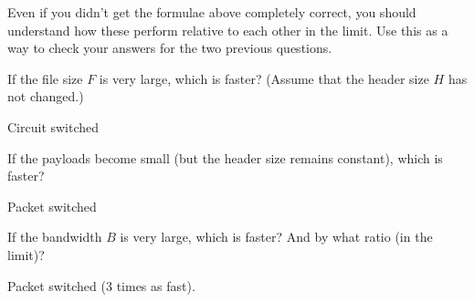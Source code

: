 \documentclass{supervision}
\begin{document}
\begin{questions}
\begin{parts}
\begin{description}
      Even if you didn’t get the formulae above completely correct, you should understand how these perform relative to each other in the limit. Use this as a way to check your answers for the two previous questions.
      \begin{subparts}
        \subpart
        If the file size $F$ is very large, which is faster? (Assume that
the header size $H$ has not changed.)
        \begin{solution}
        Circuit switched
        \end{solution}

        \subpart
        If the payloads become small (but the header size remains constant), which is faster?
        \begin{solution}
        Packet switched
        \end{solution}

        \subpart
        If the bandwidth $B$ is very large, which is faster? And by
what ratio (in the limit)?
        \begin{solution}
        Packet switched (3 times as fast).
        \end{solution}

      \end{subparts}
    \end{description}

  \end{parts}


  
\end{questions}
\end{document}
